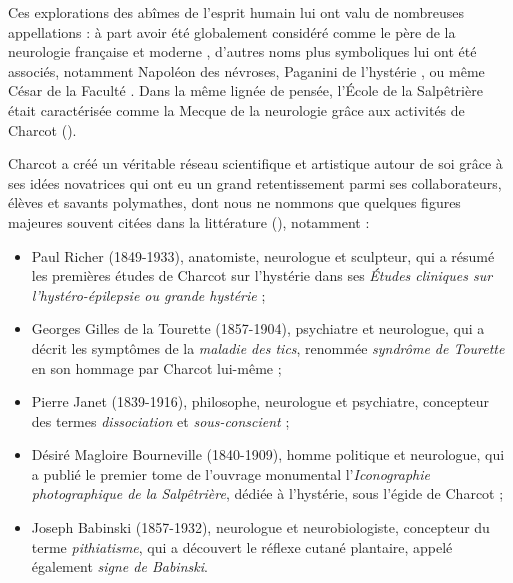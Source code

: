 Ces explorations des abîmes de l'esprit humain lui ont valu de nombreuses appellations : à part avoir été globalement considéré comme le père de la neurologie française et moderne \citep{teive2022thomas,broussolle2012}, d'autres noms plus symboliques lui ont été associés, notamment \og{}Napoléon des névroses\fg{}, \og{}Paganini de l'hystérie\fg{} \citep{marmion2015}, ou même \og{}César de la Faculté\fg{} \citep{camargo2024}. Dans la même lignée de pensée, l'École de la Salpêtrière était caractérisée comme la \og{}Mecque de la neurologie\fg{} grâce aux activités de Charcot (\citealp{teive2014126,GOETZ2017628,camargo2024}). 

Charcot a créé un véritable réseau scientifique et artistique autour de soi grâce à ses idées novatrices  qui ont eu un grand retentissement parmi ses collaborateurs, élèves et savants polymathes, dont nous ne nommons que quelques figures majeures souvent citées dans la littérature (\citealp{gomes2013jean,bogousslavsky2014mysteries,camargo2024}), notamment :
\begin{itemize}
\item Paul Richer (1849-1933), anatomiste, neurologue et sculpteur, qui a résumé les premières études de Charcot sur l'hystérie dans ses \textit{Études cliniques sur l'hystéro-épilepsie ou grande hystérie} ;
\item Georges Gilles de la Tourette (1857-1904), psychiatre et neurologue, qui a décrit les symptômes de la \textit{maladie des tics}, renommée \textit{syndrôme de Tourette} en son hommage par Charcot lui-même ;
\item Pierre Janet (1839-1916), philosophe, neurologue et psychiatre, concepteur des termes \textit{dissociation} et \textit{sous-conscient} ;
\item Désiré Magloire Bourneville (1840-1909), homme politique et neurologue, qui a publié le premier tome de l'ouvrage monumental l'\textit{Iconographie photographique de la Salpêtrière}, dédiée à l'hystérie, sous l'égide de Charcot ; 
\item Joseph Babinski (1857-1932), neurologue et neurobiologiste, concepteur du terme \textit{pithiatisme}, qui a découvert le réflexe cutané plantaire, appelé également \textit{signe de Babinski}.
\end{itemize}
\bigskip

